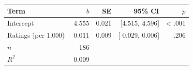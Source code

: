 \begin{tabular}{lrrrr}
\toprule
Term & $b$ & SE & 95\% CI & $p$ \\
\midrule
Intercept & 4.555 & 0.021 & [4.515, 4.596] & \textless{} .001 \\
Ratings (per 1,000) & -0.011 & 0.009 & [-0.029, 0.006] & .206 \\
$n$ & 186 &  &  &  \\
$R^2$ & 0.009 &  &  &  \\
\bottomrule
\end{tabular}
